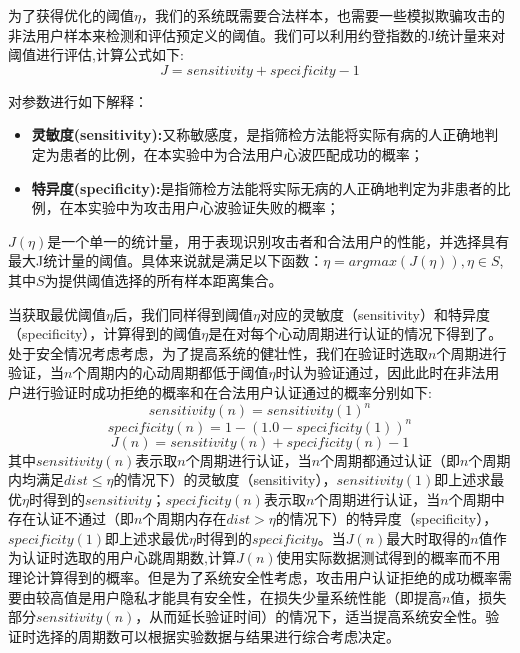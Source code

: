 \par
{为了获得优化的阈值$\eta$，我们的系统既需要合法样本，也需要一些模拟欺骗攻击的非法用户样本来检测和评估预定义的阈值。我们可以利用约登指数的J统计量来对阈值进行评估\cite{2014Shoulder},计算公式如下:}
\begin{equation}
    J=sensitivity+specificity-1
\end{equation}
\par 
{对参数进行如下解释：}
\par
\begin{itemize}
    \item {\textbf{灵敏度(sensitivity):}}{又称敏感度，是指筛检方法能将实际有病的人正确地判定为患者的比例，在本实验中为合法用户心波匹配成功的概率；}
    \item {\textbf{特异度(specificity):}}{是指筛检方法能将实际无病的人正确地判定为非患者的比例，在本实验中为攻击用户心波验证失败的概率；}
\end{itemize}
\par
{$J(\eta)$是一个单一的统计量，用于表现识别攻击者和合法用户的性能，并选择具有最大J统计量的阈值。具体来说就是满足以下函数：$\eta=argmax(J(\eta)),\eta \in S$,其中$S$为提供阈值选择的所有样本距离集合。}
\par
{当获取最优阈值$\eta$后，我们同样得到阈值$\eta$对应的灵敏度（sensitivity）和特异度（specificity），计算得到的阈值$\eta$是在对每个心动周期进行认证的情况下得到了。处于安全情况考虑考虑，为了提高系统的健壮性，我们在验证时选取$n$个周期进行验证，当$n$个周期内的心动周期都低于阈值$\eta$时认为验证通过，因此此时在非法用户进行验证时成功拒绝的概率和在合法用户认证通过的概率分别如下:}
\begin{equation}
    sensitivity(n)= sensitivity(1)^n
\end{equation}
\begin{equation}
    specificity(n)=1-(1.0- specificity(1))^n
\end{equation}
\begin{equation}
    J(n)= sensitivity(n)+ specificity(n)-1
\end{equation}
{其中$sensitivity(n)$表示取$n$个周期进行认证，当$n$个周期都通过认证（即$n$个周期内均满足$dist \leq \eta$的情况下）的灵敏度（sensitivity），$sensitivity(1)$即上述求最优$\eta$时得到的$sensitivity$；$ specificity (n)$表示取$n$个周期进行认证，当$n$个周期中存在认证不通过（即$n$个周期内存在$dist>\eta$的情况下）的特异度（specificity），$ specificity (1)$即上述求最优$\eta$时得到的$ specificity $。当$J(n)$最大时取得的$n$值作为认证时选取的用户心跳周期数,计算$J(n)$使用实际数据测试得到的概率而不用理论计算得到的概率。但是为了系统安全性考虑，攻击用户认证拒绝的成功概率需要由较高值是用户隐私才能具有安全性，在损失少量系统性能（即提高$n$值，损失部分$sensitivity(n)$，从而延长验证时间）的情况下，适当提高系统安全性。验证时选择的周期数可以根据实验数据与结果进行综合考虑决定。}